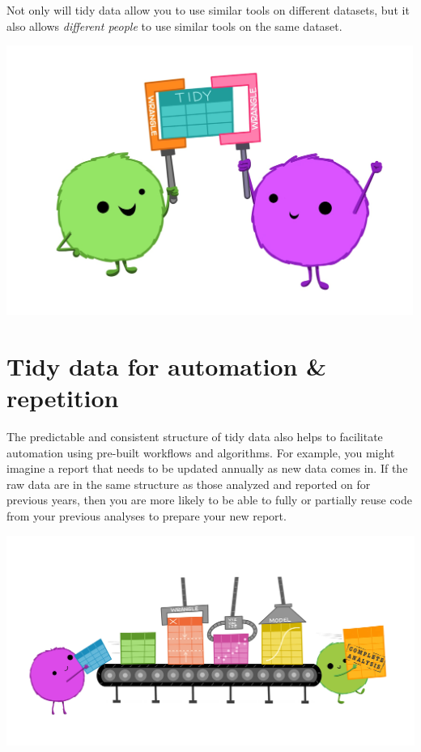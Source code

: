 \documentclass[
]{book}
\begin{document}
Not only will tidy data allow you to use similar tools on different datasets, but it also allows \emph{different people} to use similar tools on the same dataset.

\includegraphics[width=5.22917in,height=\textheight]{images/tidydata_4.jpg}

\hypertarget{tidy-data-for-automation-repetition}{%
\section{Tidy data for automation \& repetition}\label{tidy-data-for-automation-repetition}}

The predictable and consistent structure of tidy data also helps to facilitate automation using pre-built workflows and algorithms. For example, you might imagine a report that needs to be updated annually as new data comes in. If the raw data are in the same structure as those analyzed and reported on for previous years, then you are more likely to be able to fully or partially reuse code from your previous analyses to prepare your new report.

\includegraphics{images/tidydata_5.jpg}
\end{document}
